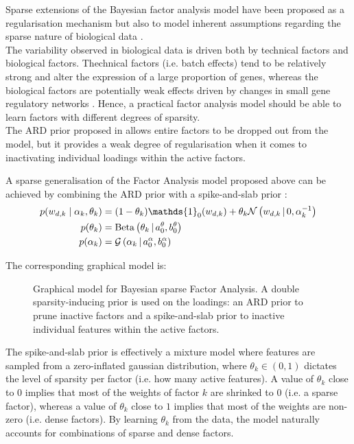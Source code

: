 Sparse extensions of the Bayesian factor analysis model have been proposed as a regularisation mechanism but also to model inherent assumptions regarding the sparse nature of biological data \cite{Stegle2012,Gao2013}.\\
The variability observed in biological data is driven both by technical factors and biological factors. Thechnical factors (i.e. batch effects) tend to be relatively strong and alter the expression of a large proportion of genes, whereas the biological factors are potentially weak effects driven by changes in small gene regulatory networks \cite{Gao2013}. Hence, a practical factor analysis model should be able to learn factors with different degrees of sparsity.\\
The ARD prior proposed in  allows entire factors to be dropped out from the model, but it provides a weak degree of regularisation when it comes to inactivating individual loadings within the active factors.

A sparse generalisation of the Factor Analysis model proposed above can be achieved by combining the ARD prior with a spike-and-slab prior \cite{Mitchell1988,Titsias2011}:
\begin{align}
	p(w_{d,k} \mid \alpha_k,\theta_k) &= (1-\theta_k) \mathds{1}_0(w_{d,k}) + \theta_k \Ndist{w_{d,k}}{0, \alpha_k^{-1}} \\
	p(\theta_k) &= \Bdist{\theta_k}{a_0^\theta,b_0^\theta} \\
	p(\alpha_k) &= \Gdist{\alpha_k}{a_0^\alpha, b_0^\alpha}
\end{align}

The corresponding graphical model is:

\begin{figure}[H] \begin{center}
	
	\label{fig:bayesianFA}
	\caption{Graphical model for Bayesian sparse Factor Analysis. A double sparsity-inducing prior is used on the loadings: an ARD prior to prune inactive factors and a spike-and-slab prior to inactive individual features within the active factors.}
\end{center} \end{figure}

The spike-and-slab prior is effectively a mixture model where features are sampled from a zero-inflated gaussian distribution, where $\theta_k \in (0,1)$ dictates the level of sparsity per factor (i.e. how many active features). A value of $\theta_k$ close to $0$ implies that most of the weights of factor $k$ are shrinked to $0$ (i.e. a sparse factor), whereas a value of $\theta_k$ close to $1$ implies that most of the weights are non-zero (i.e. dense factors). By learning $\theta_k$ from the data, the model naturally accounts for combinations of sparse and dense factors.


